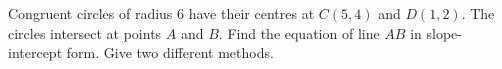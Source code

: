 Congruent circles of radius $6$ have their centres at $C(5,4)$ and $D(1,2)$. The circles intersect at points $A$ and $B$. Find the equation of line $AB$ in slope-intercept form. Give two different methods.

